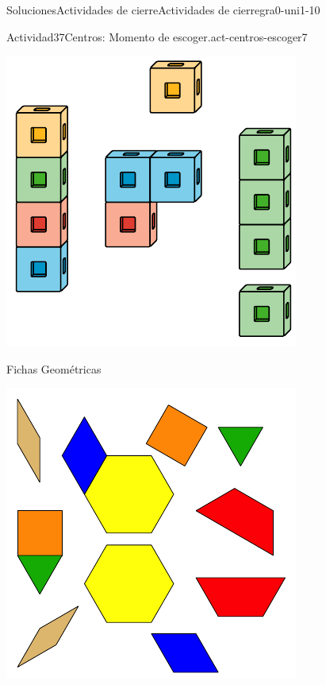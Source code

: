 \documentclass[twoside,10pt,]{article}
\begin{document}
\begin{solutions-section}{Soluciones}{Actividades de cierre}{}{Actividades de cierre}{}{}{gra0-uni1-10}
\begin{activitysolution}{Actividad}{37}{Centros: Momento de escoger.}{act-centros-escoger7}
\begin{sidebyside}{2}{0.025}{0.025}{0.05}
\begin{sbspanel}{0.45}
\includegraphics[width=\linewidth]{external/svg-source/tikz-file-128850.pdf}
\end{sbspanel}%
\begin{sbspanel}{0.45}%
Fichas Geométricas%
\par
\includegraphics[width=\linewidth]{external/svg-source/tikz-file-147344.pdf}

\end{sbspanel}
\end{sidebyside}
\end{activitysolution}
\end{solutions-section}
\end{document}
